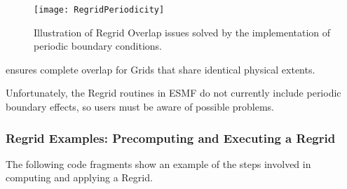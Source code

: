\begin{center}
\begin{figure}
\caption{Illustration of Regrid Overlap issues solved by the implementation
         of periodic boundary conditions. }
\label{fig:RegridPeriodicity}
\resizebox{\textwidth}{!}
  {\texttt{[image: RegridPeriodicity]}}
\end{figure}
\end{center}

ensures complete overlap for Grids that share identical physical extents.

Unfortunately, the Regrid routines in ESMF do not currently include periodic
boundary effects, so users must be aware of possible problems.


\subsubsection{Regrid Examples: Precomputing and Executing a Regrid}
\label{sec:RegridExamples}

The following code fragments show an example of the steps involved in
computing and applying a Regrid.


